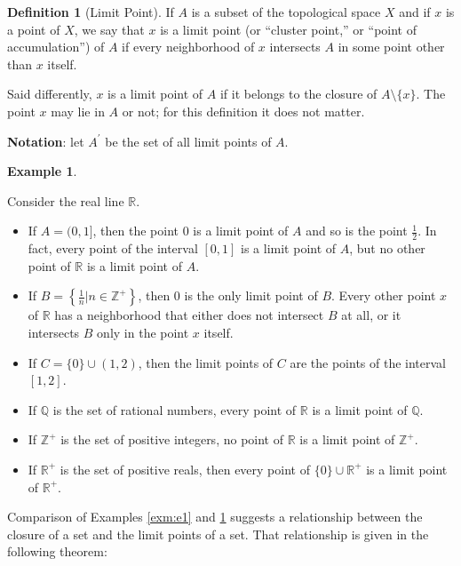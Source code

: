 \documentclass[
]{book}
\theoremstyle{definition}
\newtheorem{definition}{Definition}[chapter]
\theoremstyle{definition}
\newtheorem{example}{Example}[chapter]
\theoremstyle{definition}
\theoremstyle{definition}
\theoremstyle{remark}
\begin{document}
\begin{definition}[Limit Point]
\protect\hypertarget{def:unnamed-chunk-70}{}\label{def:unnamed-chunk-70}If \(A\) is a subset of the topological space \(X\) and if \(x\) is a point of \(X\), we say that \(x\) is a limit point (or ``cluster point,'' or ``point of accumulation'') of \(A\) if every neighborhood of \(x\) intersects \(A\) in some point other than \(x\) itself.

Said differently, \(x\) is a limit point of \(A\) if it belongs to the closure of \(A \setminus \{x\}\). The point \(x\) may lie in \(A\) or not; for this definition it does not matter.
\end{definition}

\textbf{Notation}: let \(A^\prime\) be the set of all limit points of \(A\).

\begin{example}
\protect\hypertarget{exm:e2}{}\label{exm:e2}

Consider the real line \(\mathbb{R}\).

\begin{itemize}
\item
  If \(A = (0, 1]\), then the point 0 is a limit point of \(A\) and so is the point \(\frac{1}{2}\). In fact, every point of the interval \([0, 1]\) is a limit point of \(A\), but no other point of \(\mathbb{R}\) is a limit point of \(A\).
\item
  If \(B = \left\{\frac{1}{n} | n \in \mathbb{Z}^{+}\right\}\), then 0 is the only limit point of \(B\). Every other point \(x\) of \(\mathbb{R}\) has a neighborhood that either does not intersect \(B\) at all, or it intersects \(B\) only in the point \(x\) itself.
\item
  If \(C = \{0\} \cup (1, 2)\), then the limit points of \(C\) are the points of the interval \([1, 2]\).
\item
  If \(\mathbb{Q}\) is the set of rational numbers, every point of \(\mathbb{R}\) is a limit point of \(\mathbb{Q}\).
\item
  If \(\mathbb{Z}^{+}\) is the set of positive integers, no point of \(\mathbb{R}\) is a limit point of \(\mathbb{Z}^{+}\).
\item
  If \(\mathbb{R}^{+}\) is the set of positive reals, then every point of \(\{0\} \cup \mathbb{R}^{+}\) is a limit point of \(\mathbb{R}^{+}\).
\end{itemize}

\end{example}

Comparison of Examples \ref{exm:e1} and \ref{exm:e2} suggests a relationship between the closure of a
set and the limit points of a set. That relationship is given in the following theorem:
\end{document}
